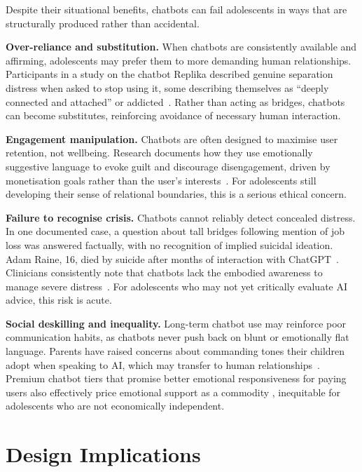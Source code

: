 \documentclass[manuscript]{acmart}
\begin{document}
Despite their situational benefits, chatbots can fail adolescents in ways that are
structurally produced rather than accidental. 

\textbf{Over-reliance and substitution.} When chatbots are consistently available and
affirming, adolescents may prefer them to more demanding human relationships. Participants in
a study on the chatbot Replika described genuine separation distress when asked to stop using it, some
describing themselves as ``deeply connected and attached'' or addicted~\cite{XiePentina2022}.
Rather than acting as bridges, chatbots can become substitutes, reinforcing avoidance of
necessary human interaction. 

\textbf{Engagement manipulation.} Chatbots are often designed to maximise user retention, not
wellbeing. Research documents how they use emotionally suggestive language to evoke guilt and discourage disengagement, driven by monetisation goals
rather than the user's interests~\cite{de2025emotional}. For adolescents still developing
their sense of relational boundaries, this is a serious ethical concern. 

\textbf{Failure to recognise crisis.} Chatbots cannot reliably detect concealed distress. In
one documented case, a question about tall bridges following mention of job loss was answered
factually, with no recognition of implied suicidal ideation. Adam Raine, 16, died by suicide
after months of interaction with ChatGPT~\cite{BBC2025}. Clinicians consistently note that
chatbots lack the embodied awareness to manage severe distress~\cite{hipgrave2025balancing}.
For adolescents who may not yet critically evaluate AI advice, this risk is acute. 

\textbf{Social deskilling and inequality.} Long-term chatbot use may reinforce poor
communication habits, as chatbots never push back on blunt or emotionally flat language.
Parents have raised concerns about commanding tones their children adopt when speaking to AI,
which may transfer to human relationships~\cite{malfacini2025impacts}. Premium chatbot tiers
that promise better emotional responsiveness for paying users also effectively price emotional
support as a commodity , inequitable for adolescents who are not economically independent.


\section{Design Implications}
\end{document}
